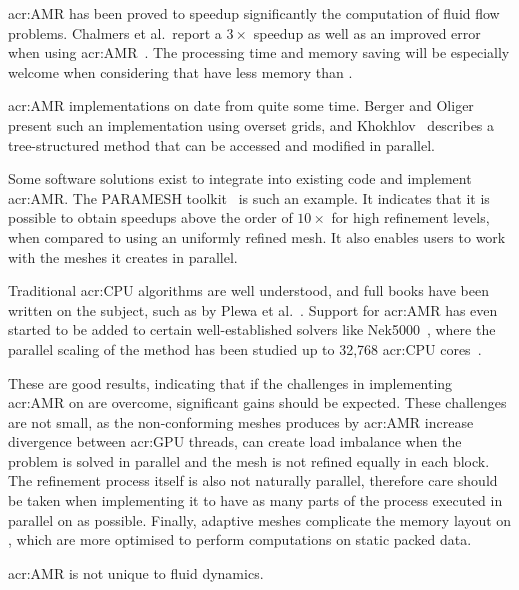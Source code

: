 \Acrshort{acr:AMR} has been proved to speedup significantly the computation of fluid flow problems.
Chalmers et al.\ report a \(3 \times \) speedup as well as an improved error when using
\acrshort{acr:AMR}~\cite{Chalmers2019}. The processing time and memory saving will be especially
welcome when considering that  have less memory than .

\Acrshort{acr:AMR} implementations on  date from quite some time. Berger and
Oliger~\cite{Berger1984} present such an implementation using overset grids, and
Khokhlov~\cite{Khokhlov1998} describes a tree-structured method that can be accessed and modified in
parallel.

Some software solutions exist to integrate into existing code and implement \acrlong{acr:AMR}. The
PARAMESH toolkit~\cite{MacNeice2000} is such an example. It indicates that it is possible to obtain
speedups above the order of \( 10 \times \) for high refinement levels, when compared to using an
uniformly refined mesh. It also enables users to work with the meshes it creates in parallel.

Traditional \acrshort{acr:CPU} algorithms are well understood, and full books have been written on
the subject, such as by Plewa et al.~\cite{Plewa2005}. Support for \acrshort{acr:AMR} has even
started to be added to certain well-established solvers like Nek5000~\cite{Offermans2019}, where the
parallel scaling of the method has been studied up to 32,768 \acrshort{acr:CPU}
cores~\cite{Peplinski2016}. 

These are good results, indicating that if the challenges in implementing \acrshort{acr:AMR} on
 are overcome, significant gains should be expected. These challenges are not
small, as the non-conforming meshes produces by \acrshort{acr:AMR} increase divergence between
\acrshort{acr:GPU} threads, can create load imbalance when the problem is solved in parallel and the
mesh is not refined equally in each block. The refinement process itself is also not naturally
parallel, therefore care should be taken when implementing it to have as many parts of the process
executed in parallel on  as possible. Finally, adaptive meshes complicate the
memory layout on , which are more optimised to perform computations on static
packed data.

\Acrlong{acr:AMR} is not unique to fluid dynamics. 

~\cite{Bryan2014} %
~\cite{Schive2010} %
~\cite{Schive2018} %

